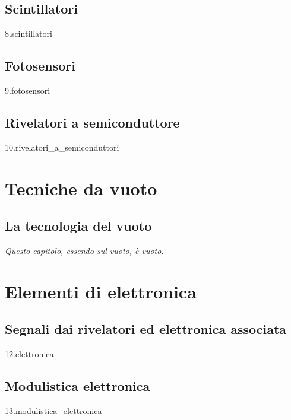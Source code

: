 \documentclass[12pt,openany]{book}
\newcommand\blankpage{%
    \null
    \thispagestyle{empty}%
    \newpage} %
\begin{document}
\chapter{Scintillatori}
{8.scintillatori}

\afterpage{\blankpage}
\newpage

\chapter{Fotosensori}
{9.fotosensori}

\afterpage{\blankpage}
\newpage

\chapter{Rivelatori a semiconduttore}
{10.rivelatori_a_semiconduttori}

\part{Tecniche da vuoto}

\chapter{La tecnologia del vuoto}
\textit{Questo capitolo, essendo sul vuoto, è vuoto.}

\part{Elementi di elettronica}

\chapter{Segnali dai rivelatori ed elettronica associata}
{12.elettronica}

\chapter{Modulistica elettronica}\label{chap:modulistica_elettronica}
{13.modulistica_elettronica}
\end{document}
